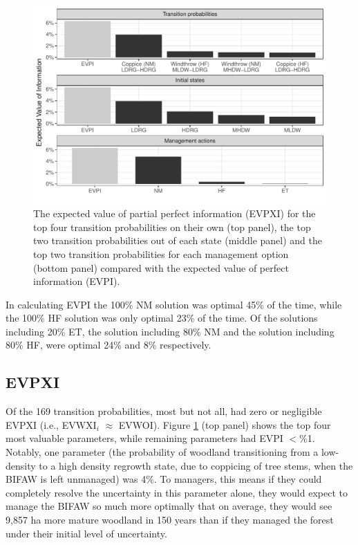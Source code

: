 \documentclass[draft]{article}
\theoremstyle{definition}
\theoremstyle{definition}
\theoremstyle{definition}
\theoremstyle{remark}
\begin{document}
\begin{figure}[htbp]
\centering
\includegraphics{Figure3-1.pdf}
\caption{\label{fig:Figure3}The expected value of partial perfect information
(EVPXI) for the top four transition probabilities on their own (top
panel), the top two transition probabilities out of each state (middle
panel) and the top two transition probabilities for each management
option (bottom panel) compared with the expected value of perfect
information (EVPI).}
\end{figure}

In calculating EVPI the 100\% NM solution was optimal 45\% of the time,
while the 100\% HF solution was only optimal 23\% of the time. Of the
solutions including 20\% ET, the solution including 80\% NM and the
solution including 80\% HF, were optimal 24\% and 8\% respectively.

\subsection*{EVPXI}\label{evpxi-1}

Of the 169 transition probabilities, most but not all, had zero or
negligible EVPXI (i.e., EVWXI\(_i\) \(\approx\) EVWOI). Figure
\ref{fig:Figure3} (top panel) shows the top four most valuable
parameters, while remaining parameters had EVPI \(<\)\%1. Notably, one
parameter (the probability of woodland transitioning from a low-density
to a high density regrowth state, due to coppicing of tree stems, when
the BIFAW is left unmanaged) was 4\%. To managers, this means if they
could completely resolve the uncertainty in this parameter alone, they
would expect to manage the BIFAW so much more optimally that on average,
they would see 9,857 ha more mature woodland in 150 years than if they
managed the forest under their initial level of uncertainty.
\end{document}
